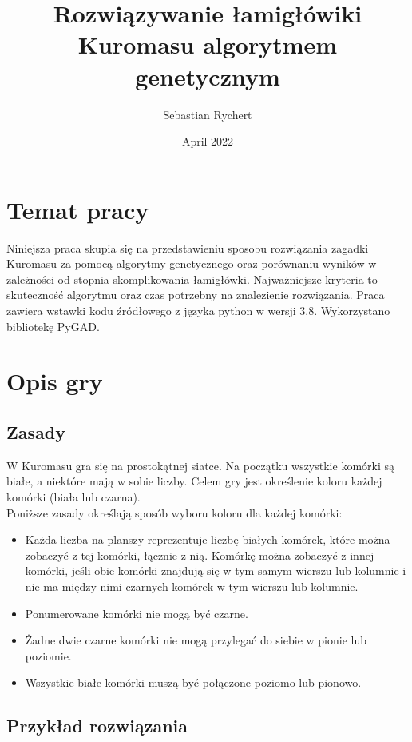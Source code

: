\documentclass{article}
\title{Rozwiązywanie łamigłówiki Kuromasu algorytmem genetycznym}
\author{Sebastian Rychert}
\date{April 2022}
\begin{document}
\maketitle

\tableofcontents
\clearpage

\section{Temat pracy}
Niniejsza praca skupia się na przedstawieniu sposobu rozwiązania zagadki Kuromasu za pomocą algorytmy genetycznego oraz porównaniu wyników w zależności od stopnia skomplikowania łamigłówki. Najważniejsze kryteria to skuteczność algorytmu oraz czas potrzebny na znalezienie rozwiązania. Praca zawiera wstawki kodu źródłowego z języka python w wersji 3.8. Wykorzystano bibliotekę PyGAD.

\section{Opis gry}
\subsection{Zasady}
W Kuromasu gra się na prostokątnej siatce. Na początku wszystkie komórki są białe, a niektóre mają w sobie liczby. Celem gry jest określenie koloru każdej komórki (biała lub czarna).\\
\newline
Poniższe zasady określają sposób wyboru koloru dla każdej komórki:

\begin{itemize}
  \item Każda liczba na planszy reprezentuje liczbę białych komórek, które można zobaczyć z tej komórki, łącznie z nią. Komórkę można zobaczyć z innej komórki, jeśli obie komórki znajdują się w tym samym wierszu lub kolumnie i nie ma między nimi czarnych komórek w tym wierszu lub kolumnie.
  \item Ponumerowane komórki nie mogą być czarne.
  \item Żadne dwie czarne komórki nie mogą przylegać do siebie w pionie lub poziomie.
  \item Wszystkie białe komórki muszą być połączone poziomo lub pionowo.
\end{itemize}

\subsection{Przykład rozwiązania}
\vspace{1cm}
\end{document}

